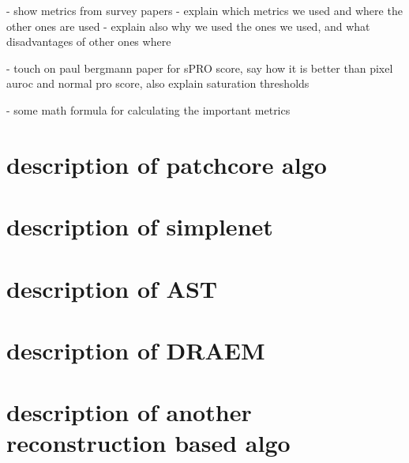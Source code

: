 - show metrics from survey papers
- explain which metrics we used and where the other ones are used
- explain also why we used the ones we used, and what disadvantages of other ones where

- touch on paul bergmann paper for sPRO score, say how it is better than pixel auroc and normal pro score, also explain saturation thresholds

- some math formula for calculating the important metrics





\section{description of patchcore algo}


\section{description of simplenet}

\section{description of AST}

\section{description of DRAEM}

\section{description of another reconstruction based algo}
















